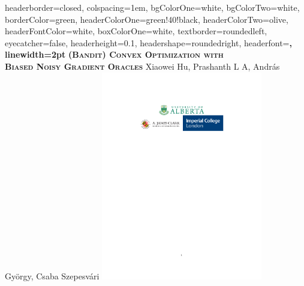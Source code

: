 \documentclass[portrait,a0paper,fontscale=0.285]{baposter} %
\begin{document}
\begin{poster}
{
headerborder=closed, %
colspacing=1em, %
bgColorOne=white, %
bgColorTwo=white, %
borderColor=green, %
headerColorOne=green!40!black, %
headerColorTwo=olive, %
headerFontColor=white, %
boxColorOne=white, %
textborder=roundedleft, %
eyecatcher=false, %
headerheight=0.1\textheight, %
headershape=roundedright, %
headerfont=\Large\bf\textsc, %
linewidth=2pt %
}
%
{}
{\bf\textsc{(Bandit) Convex Optimization with\\ Biased Noisy Gradient Oracles}\vspace{0.5em}} %
{ Xiaowei  Hu, Prashanth L A, Andr\'as Gy\"orgy, Csaba Szepesv\'ari } %
{
\includegraphics[width=19em]{logo.pdf}
} %




\end{poster}
\end{document}
